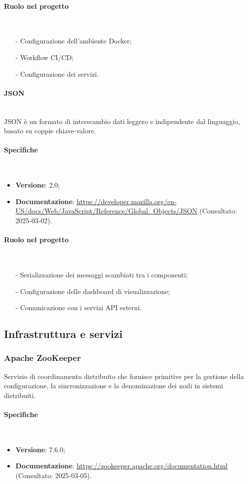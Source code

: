 \documentclass[10pt]{article}
\newcommand{\myparagraph}[1]{\paragraph{#1}\mbox{}\\}
\begin{document}
\myparagraph{Ruolo nel progetto}
\begin{itemize}
    \item[-] Configurazione dell'ambiente Docker;
    \item[-] Workflow CI/CD;
    \item[-] Configurazione dei servizi.
\end{itemize}

\myparagraph{JSON}
JSON è un formato di interscambio dati leggero e indipendente dal linguaggio, basato su coppie chiave-valore.

\myparagraph{Specifiche}
\begin{itemize}
    \item \textbf{Versione}: 2.0;
    \item \textbf{Documentazione}: \textcolor{blue}{\url{https://developer.mozilla.org/en-US/docs/Web/JavaScript/Reference/Global_Objects/JSON}} (Consultato: 2025-03-02).
\end{itemize}

\myparagraph{Ruolo nel progetto}
\begin{itemize}
    \item[-] Serializzazione dei messaggi scambiati tra i componenti;
    \item[-] Configurazione delle dashboard di visualizzazione;
    \item[-] Comunicazione con i servizi API esterni.
\end{itemize}

\subsection{Infrastruttura e servizi}
\label{sec:strumenti}

\subsubsection{Apache ZooKeeper}
Servizio di coordinamento distribuito che fornisce primitive per la gestione della configurazione, la sincronizzazione e la denominazione dei nodi in sistemi distribuiti.

\myparagraph{Specifiche}
\begin{itemize}
    \item \textbf{Versione}: 7.6.0;
    \item \textbf{Documentazione}: \textcolor{blue}{\url{https://zookeeper.apache.org/documentation.html}} (Consultato: 2025-03-05).
\end{itemize}
\end{document}
